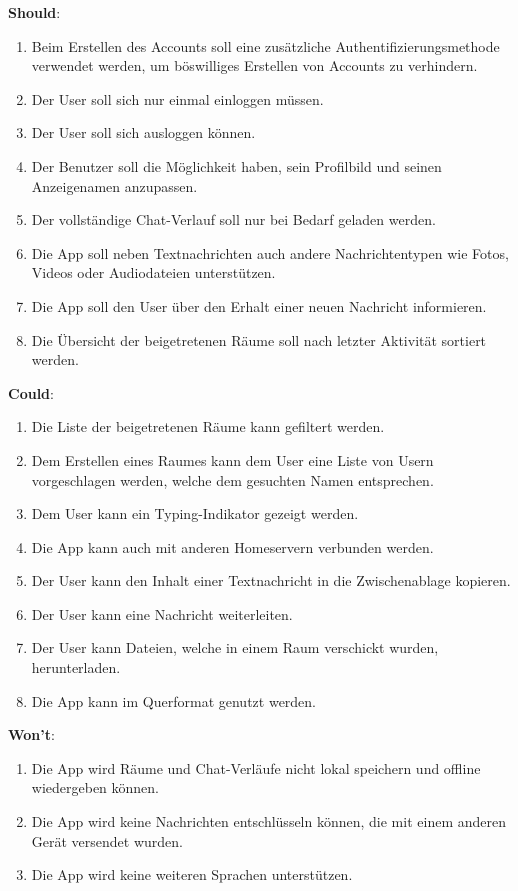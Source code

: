     \textbf{Should}:
    \begin{enumerate}[label={\roman*.}, leftmargin=2.5cm]
        \item Beim Erstellen des Accounts soll eine zusätzliche Authentifizierungsmethode verwendet werden, um böswilliges Erstellen von Accounts zu verhindern.
        \item Der User soll sich nur einmal einloggen müssen.
        \item Der User soll sich ausloggen können.
        \item Der Benutzer soll die Möglichkeit haben, sein Profilbild und seinen Anzeigenamen anzupassen.
        \item Der vollständige Chat-Verlauf soll nur bei Bedarf geladen werden.
        \item Die App soll neben Textnachrichten auch andere Nachrichtentypen wie Fotos, Videos oder Audiodateien unterstützen.
        \item Die App soll den User über den Erhalt einer neuen Nachricht informieren.
        \item Die Übersicht der beigetretenen Räume soll nach letzter Aktivität sortiert werden.
    \end{enumerate}


    \textbf{Could}:
    \begin{enumerate}[label={\roman*.}, leftmargin=2.5cm]
        \item Die Liste der beigetretenen Räume kann gefiltert werden.
        \item Dem Erstellen eines Raumes kann dem User eine Liste von Usern vorgeschlagen werden, welche dem gesuchten Namen entsprechen.
        \item Dem User kann ein Typing-Indikator gezeigt werden.
        \item Die App kann auch mit anderen Homeservern verbunden werden.
        \item Der User kann den Inhalt einer Textnachricht in die Zwischenablage kopieren.
        \item Der User kann eine Nachricht weiterleiten.
        \item Der User kann Dateien, welche in einem Raum verschickt wurden, herunterladen.
        \item Die App kann im Querformat genutzt werden.
    \end{enumerate}

    \textbf{Won't}:
    \begin{enumerate}[label={\roman*.}, leftmargin=2.5cm]
        \item Die App wird Räume und Chat-Verläufe nicht lokal speichern und offline wiedergeben können.
        \item Die App wird keine Nachrichten entschlüsseln können, die mit einem anderen Gerät versendet wurden.
        \item Die App wird keine weiteren Sprachen unterstützen.
    \end{enumerate}

